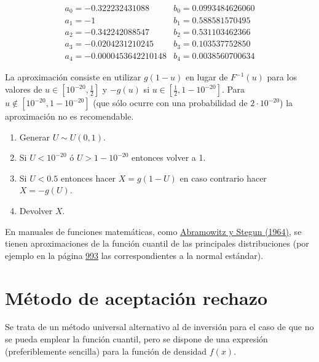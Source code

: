 \documentclass[
]{book}
\theoremstyle{break}
\theoremstyle{definition}
\theoremstyle{definition}
\theoremstyle{definition}
\theoremstyle{remark}
\let\BeginKnitrBlock\begin \let\EndKnitrBlock\end
\begin{document}
\[\begin{array}{ll}
a_{0}=-0.322232431088 &  b_{0}=0.0993484626060 \\
a_{1}=-1 &  b_{1}=0.588581570495 \\
a_{2}=-0.342242088547 & b_{2}=0.531103462366 \\
a_{3}=-0.0204231210245 & b_{3}=0.103537752850 \\
a_{4}=-0.0000453642210148 & b_{4}=0.0038560700634
\end{array}\]

La aproximación consiste en utilizar \(g\left( 1-u\right)\) en lugar de
\(F^{-1}\left( u\right)\) para los valores de \(u\in[10^{-20},\frac12]\)
y \(-g\left( u\right)\) si \(u\in[\frac12,1-10^{-20}]\). Para \(u\notin [10^{-20},1-10^{-20}]\) (que sólo ocurre con una probabilidad de
\(2\cdot10^{-20}\)) la aproximación no es recomendable.

\BeginKnitrBlock{conjecture}[de Odeh y Evans]
\protect\hypertarget{cnj:Odeh-Evans}{}{\label{cnj:Odeh-Evans} {} }

\begin{enumerate}
\def\labelenumi{\arabic{enumi}.}
\item
  Generar \(U \sim U(0, 1)\).
\item
  Si \(U<10^{-20}\) ó \(U>1-10^{-20}\) entonces volver a 1.
\item
  Si \(U<0.5\) entonces hacer \(X=g\left(1-U\right)\)
  en caso contrario hacer \(X=-g\left( U\right)\).
\item
  Devolver \(X\).
\end{enumerate}
\EndKnitrBlock{conjecture}

En manuales de funciones matemáticas, como \href{https://www.math.ubc.ca/~cbm/aands/frameindex.htm}{Abramowitz y Stegun (1964)},
se tienen aproximaciones de la función cuantil de las principales distribuciones
(por ejemplo en la página \href{https://www.math.ubc.ca/~cbm/aands/page_933.htm}{993}
las correspondientes a la normal estándar).

\hypertarget{AR}{%
\section{Método de aceptación rechazo}\label{AR}}

Se trata de un método universal alternativo al de inversión para
el caso de que no se pueda emplear la función cuantil,
pero se dispone de una expresión (preferiblemente sencilla) para la
función de densidad \(f\left( x \right)\).
\end{document}
